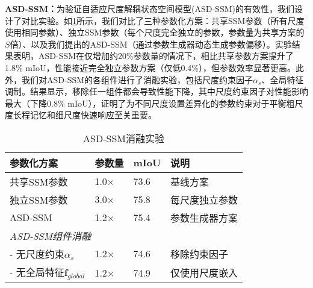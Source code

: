 \documentclass[preprint,12pt]{elsarticle}
\begin{document}
\textbf{ASD-SSM：}为验证自适应尺度解耦状态空间模型(ASD-SSM)的有效性，我们设计了对比实验。如\cref{tab:asdssm}所示，我们对比了三种参数化方案：共享SSM参数（所有尺度使用相同参数）、独立SSM参数（每个尺度完全独立的参数，参数量为共享方案的$S$倍）、以及我们提出的ASD-SSM（通过参数生成器动态生成参数偏移）。实验结果表明，ASD-SSM在仅增加约20\%参数量的情况下，相比共享参数方案提升了1.8\% mIoU，性能接近完全独立参数方案（仅低0.4\%），但参数效率显著更高。此外，我们对ASD-SSM的各组件进行了消融实验，包括尺度约束因子$\alpha_s$、全局特征调制。结果显示，移除任一组件都会导致性能下降，其中尺度约束因子对性能影响最大（下降0.8\% mIoU），证明了为不同尺度设置差异化的参数约束对于平衡粗尺度长程记忆和细尺度快速响应至关重要。
\begin{table}[htbp!]
	\centering
	\caption{ASD-SSM消融实验}
	\label{tab:asdssm}
	\begin{tabular}{@{}llll@{}}
		\toprule
		参数化方案 & 参数量 & mIoU & 说明\\ \midrule
		共享SSM参数 & 1.0$\times$ & 73.6 & 基线方案\\
		独立SSM参数 & 3.0$\times$ & 75.8 & 每尺度独立参数\\
		ASD-SSM & 1.2$\times$ & 75.4 & 参数生成器方案\\
		\midrule
		\multicolumn{4}{l}{\textit{ASD-SSM组件消融}} \\
		\quad - 无尺度约束$\alpha_s$ & 1.2$\times$ & 74.6 & 移除约束因子\\
		\quad - 无全局特征$\mathbf{f}_{global}$ & 1.2$\times$ & 74.9 & 仅使用尺度嵌入\\
		\bottomrule
	\end{tabular}
\end{table}
\end{document}
